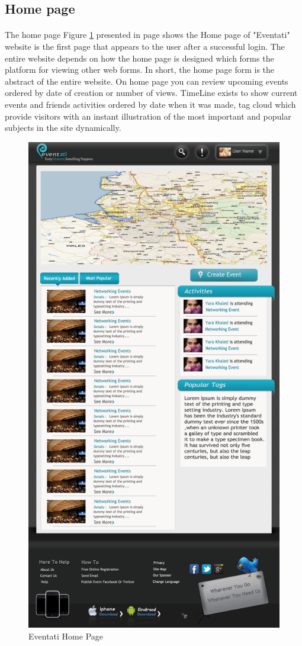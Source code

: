 \documentclass[12pt,a4paper,class,twoside,openany]{report}
\begin{document}
{\subsection{Home page}
 \paragraph*{\hspace{.9 cm} }The home page Figure \ref{fg:6-9} presented in page \pageref{fg:6-9} shows the Home page of "Eventati" website is the first page that appears to the user after a successful login. The entire website depends on how the home page is designed which forms the platform for viewing other web forms. In short, the home page form is the abstract of the entire website. On home page you can review upcoming events ordered by date of creation or number of views. TimeLine exists to show current events and friends activities ordered by date when it was made, tag cloud which provide visitors with an instant illustration of the most important and popular subjects in the site dynamically.
\begin{figure}
\begin{center}
\includegraphics[height=8 in]{6-9}
\caption{Eventati  Home Page}
\label{fg:6-9}
\end{center}
\end{figure}
}
\end{document}
